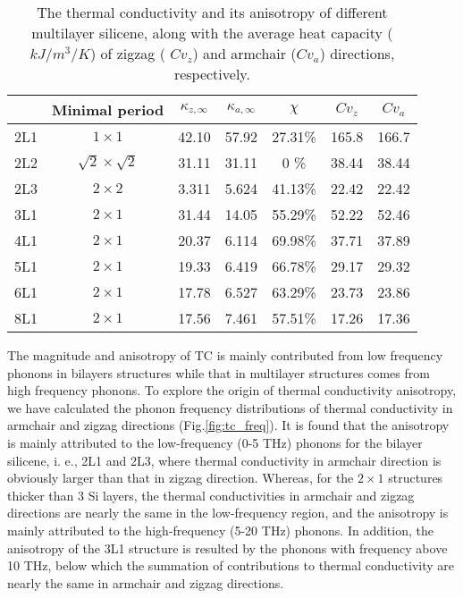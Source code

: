 \documentclass[aps,prb,twocolumn,showpacs,amsmath,amssymb]{revtex4-1}
\begin{document}
\begin{table*}
  \caption{\label{tab:table1}
    The thermal conductivity and its anisotropy of different multilayer silicene, along with the average heat capacity ($kJ/m^3/K$) of zigzag ( $Cv_z$) and armchair ($Cv_a$) directions, respectively. }
  \begin{ruledtabular}
    \begin{tabular}{ccccccc}
          & Minimal period
          & $\kappa_{z,\infty}$
          & $\kappa_{a,\infty}$
          & $\chi$
          & $Cv_{z}$
          & $Cv_{a}$                                                           \\
      \hline
      2L1 & $1 \times 1$             & 42.10 & 57.92 & 27.31\% & 165.8 & 166.7 \\
      2L2 & $\sqrt{2}\times\sqrt{2}$ & 31.11 & 31.11 & 0    \% & 38.44 & 38.44 \\
      2L3 & $2 \times 2$             & 3.311 & 5.624 & 41.13\% & 22.42 & 22.42 \\
      3L1 & $2 \times 1$             & 31.44 & 14.05 & 55.29\% & 52.22 & 52.46 \\
      4L1 & $2 \times 1$             & 20.37 & 6.114 & 69.98\% & 37.71 & 37.89 \\
      5L1 & $2 \times 1$             & 19.33 & 6.419 & 66.78\% & 29.17 & 29.32 \\
      6L1 & $2 \times 1$             & 17.78 & 6.527 & 63.29\% & 23.73 & 23.86 \\
      8L1 & $2 \times 1$             & 17.56 & 7.461 & 57.51\% & 17.26 & 17.36 \\
    \end{tabular}
  \end{ruledtabular}
\end{table*}

The magnitude and anisotropy of TC is mainly contributed from low frequency phonons in bilayers structures while that in multilayer structures comes from high frequency phonons. To explore the origin of thermal conductivity anisotropy, we have calculated the phonon frequency distributions of thermal conductivity in armchair and zigzag directions  (Fig.\ref{fig:tc_freq}).
It is found that the anisotropy is mainly attributed to the low-frequency (0-5 THz) phonons for the bilayer silicene, i. e., 2L1 and 2L3, where thermal conductivity in armchair direction is obviously larger than that in zigzag direction.
Whereas,  for the $2\times1$ structures thicker than 3 Si layers, the thermal conductivities in armchair and zigzag directions are nearly the same in the low-frequency region, and the anisotropy is mainly attributed to the high-frequency (5-20 THz) phonons.
In addition, the anisotropy of the 3L1 structure is resulted by the phonons with frequency above 10 THz, below which the summation of contributions to thermal conductivity are nearly the same in armchair and zigzag directions.
\end{document}
